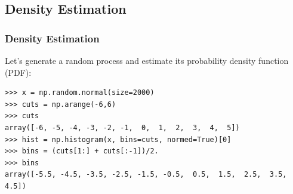 \documentclass[10pt,colorlinks]{beamer}
\begin{document}
%
\subsection{Density Estimation} %
\label{sub:Density Estimation}

\begin{frame}[fragile]\frametitle{Density Estimation}
  Let's generate a random process and estimate its probability density function (PDF):
\begin{verbatim}
>>> x = np.random.normal(size=2000)
>>> cuts = np.arange(-6,6)
>>> cuts
array([-6, -5, -4, -3, -2, -1,  0,  1,  2,  3,  4,  5])
>>> hist = np.histogram(x, bins=cuts, normed=True)[0]
>>> bins = (cuts[1:] + cuts[:-1])/2. 
>>> bins 
array([-5.5, -4.5, -3.5, -2.5, -1.5, -0.5,  0.5,  1.5,  2.5,  3.5,  4.5])
\end{verbatim}

\end{frame}
\end{document}
